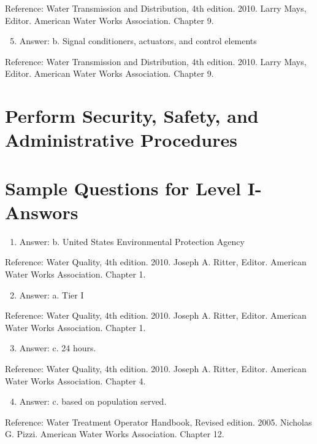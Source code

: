 \documentclass[10pt]{article}
\begin{document}
Reference: Water Transmission and Distribution, 4th edition. 2010. Larry Mays, Editor. American Water Works Association. Chapter 9.

\begin{enumerate}
  \setcounter{enumi}{4}
  \item Answer: b. Signal conditioners, actuators, and control elements
\end{enumerate}

Reference: Water Transmission and Distribution, 4th edition. 2010. Larry Mays, Editor. American Water Works Association. Chapter 9.

\section{Perform Security, Safety, and Administrative Procedures}
\section{Sample Questions for Level I-Answors}
\begin{enumerate}
  \item Answer: b. United States Environmental Protection Agency
\end{enumerate}

Reference: Water Quality, 4th edition. 2010. Joseph A. Ritter, Editor. American Water Works Association. Chapter 1.

\begin{enumerate}
  \setcounter{enumi}{1}
  \item Answer: a. Tier I
\end{enumerate}

Reference: Water Quality, 4th edition. 2010. Joseph A. Ritter, Editor. American Water Works Association. Chapter 1.

\begin{enumerate}
  \setcounter{enumi}{2}
  \item Answer: c. 24 hours.
\end{enumerate}

Reference: Water Quality, 4th edition. 2010. Joseph A. Ritter, Editor. American Water Works Association. Chapter 4.

\begin{enumerate}
  \setcounter{enumi}{3}
  \item Answer: c. based on population served.
\end{enumerate}

Reference: Water Treatment Operator Handbook, Revised edition. 2005. Nicholas G. Pizzi. American Water Works Association. Chapter 12.
\end{document}
